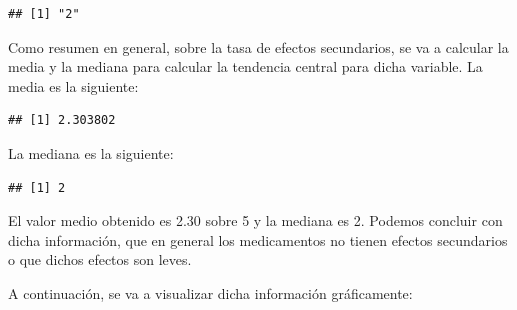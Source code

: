 \documentclass[spanish,]{article}
\newenvironment{Shaded}{\begin{snugshade}}{\end{snugshade}}
\newcommand{\KeywordTok}[1]{\textcolor[rgb]{0.13,0.29,0.53}{\textbf{#1}}}
\newcommand{\DataTypeTok}[1]{\textcolor[rgb]{0.13,0.29,0.53}{#1}}
\newcommand{\DecValTok}[1]{\textcolor[rgb]{0.00,0.00,0.81}{#1}}
\newcommand{\StringTok}[1]{\textcolor[rgb]{0.31,0.60,0.02}{#1}}
\newcommand{\CommentTok}[1]{\textcolor[rgb]{0.56,0.35,0.01}{\textit{#1}}}
\newcommand{\OtherTok}[1]{\textcolor[rgb]{0.56,0.35,0.01}{#1}}
\newcommand{\OperatorTok}[1]{\textcolor[rgb]{0.81,0.36,0.00}{\textbf{#1}}}
\newcommand{\NormalTok}[1]{#1}
\begin{document}
\begin{verbatim}
## [1] "2"
\end{verbatim}

Como resumen en general, sobre la tasa de efectos secundarios, se va a
calcular la media y la mediana para calcular la tendencia central para
dicha variable. La media es la siguiente:

\begin{Shaded}
\end{Shaded}

\begin{verbatim}
## [1] 2.303802
\end{verbatim}

La mediana es la siguiente:

\begin{Shaded}
\end{Shaded}

\begin{verbatim}
## [1] 2
\end{verbatim}

El valor medio obtenido es 2.30 sobre 5 y la mediana es 2. Podemos
concluir con dicha información, que en general los medicamentos no
tienen efectos secundarios o que dichos efectos son leves.

A continuación, se va a visualizar dicha información gráficamente:

\begin{Shaded}
\end{Shaded}
\end{document}
